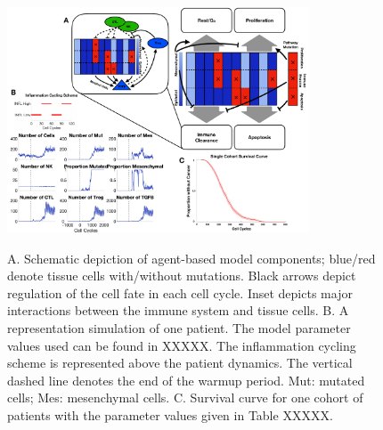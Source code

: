 \documentclass[11pt]{article}
\newcommand{\tcr} { \textcolor{red} }
\begin{document}
\begin{figure}
\center
{\includegraphics[width=0.8\textwidth]{Figure1/Figure1.pdf}}
\caption{A. Schematic depiction of agent-based model components; blue/red denote tissue cells with/without mutations. Black arrows depict regulation of the cell fate in each cell cycle. Inset depicts major interactions between the immune system and tissue cells.
B. A representation simulation of one patient. The model parameter values used can be found in XXXXX. 
The inflammation cycling scheme is represented above the patient dynamics. The vertical dashed line denotes the end of the warmup period. Mut: mutated cells; Mes: mesenchymal cells. 
C. Survival curve for one cohort of patients with the parameter values given in Table XXXXX. }
\label{fig:ModelIntro}
\end{figure}
\end{document}
